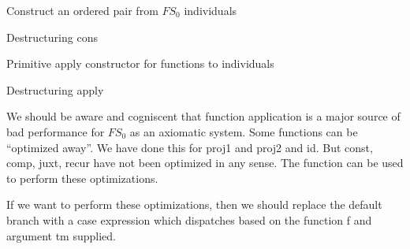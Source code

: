 \LA{}Construct an ordered pair from $FS_{0}$ individuals~{\nwtagstyle{}}\RA{}

\LA{}Destructuring \code{}cons\edoc{}~{\nwtagstyle{}}\RA{}

\LA{}Primitive \code{}apply\edoc{} constructor for functions to individuals~{\nwtagstyle{}}\RA{}

\LA{}Destructuring \code{}apply\edoc{}~{\nwtagstyle{}}\RA{}
\eatline
{}\nwendcode{}\nwdocspar
\begin{node}
We should be aware and cogniscent that function application is a major
source of bad performance for $FS_{0}$ as an axiomatic system. Some
functions can be ``optimized away''. We have done this for {\Tt{}proj1\nwendquote}
and {\Tt{}proj2\nwendquote} and {\Tt{}id\nwendquote}. But {\Tt{}const\nwendquote}, {\Tt{}comp\nwendquote}, {\Tt{}juxt\nwendquote}, {\Tt{}recur\nwendquote}
have not been optimized in any sense. The {\Tt{}\nwendquote} function can be
used to perform these optimizations.

If we want to perform these optimizations, then we should replace the
default branch with a {\Tt{}case\nwendquote} expression which dispatches based on
the function {\Tt{}f\nwendquote} and argument {\Tt{}tm\nwendquote} supplied.
\end{node}

